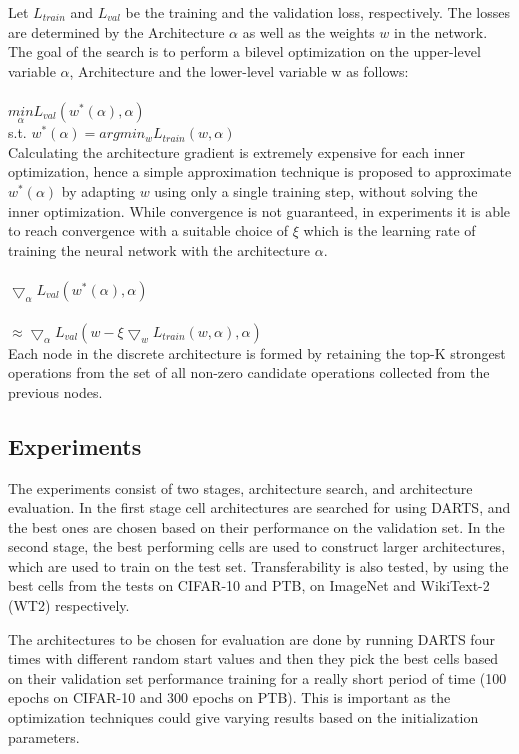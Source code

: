 \documentclass{ieee}
\begin{document}
Let $L_{train}$ and $L_{val}$ be the training and the validation loss, respectively. The losses are determined by the Architecture $\alpha$ as well as the weights $w$ in the network. The goal of the search is to perform a bilevel optimization on the upper-level variable $\alpha$, Architecture and the lower-level variable w as follows:\\ \\
$\underset{\alpha}{min}  L_{val}(w^*(\alpha), \alpha)$ \\ 

s.t. $ w^* (\alpha) = argmin_w L_{train}(w, \alpha)$ \\

Calculating the architecture gradient is extremely expensive for each inner optimization, hence a simple approximation technique is proposed to approximate $ w^*( \alpha ) $ by adapting $w$ using only a single training step, without solving the inner optimization. While convergence is not guaranteed, in experiments it is able to reach convergence with a suitable choice of $\xi$ which is the learning rate of training the neural network with the architecture $\alpha$. \\ \\
$\bigtriangledown_\alpha L_{val}(w^*(\alpha), \alpha)$ \\ \\ 
$\approx \bigtriangledown_\alpha L_{val}(w - \xi \bigtriangledown_w L_{train}(w, \alpha), \alpha)$ \\

Each node in the discrete architecture is formed by retaining the top-K strongest operations from the set of all non-zero candidate operations collected from the previous nodes.

\subsection{Experiments}
The experiments consist of two stages, architecture search, and architecture evaluation. In the first stage cell architectures are searched for using DARTS, and the best ones are chosen based on their performance on the validation set. In the second stage, the best performing cells are used to construct larger architectures, which are used to train on the test set. Transferability is also tested, by using the best cells from the tests on CIFAR-10 and PTB, on ImageNet and WikiText-2 (WT2) respectively.

The architectures to be chosen for evaluation are done by running DARTS four times with different random start values and then they pick the best cells based on their validation set performance training for a really short period of time (100 epochs on CIFAR-10 and 300 epochs on PTB). This is important as the optimization techniques could give varying results based on the initialization parameters.
\end{document}

